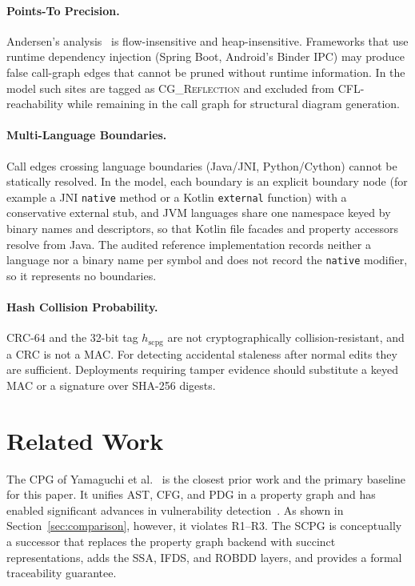 \documentclass[journal,10pt,twoside]{IEEEtran}
\newcommand{\hscpg}{h_{\mathrm{scpg}}}
\begin{document}
\paragraph{Points-To Precision.}
Andersen's analysis~\cite{anderson94} is flow-insensitive
and heap-insensitive.  Frameworks that use runtime
dependency injection (Spring Boot, Android's Binder IPC)
may produce false call-graph edges that cannot be pruned
without runtime information.  In the model such sites are
tagged as \textsc{CG\_Reflection} and excluded from
CFL-reachability while remaining in the call graph for
structural diagram generation.

\paragraph{Multi-Language Boundaries.}
Call edges crossing language boundaries (Java/JNI,
Python/Cython) cannot be statically resolved.  In the model,
each boundary is an explicit boundary node (for example a
JNI \texttt{native} method or a Kotlin \texttt{external}
function) with a conservative external stub, and JVM languages
share one namespace keyed by binary names and descriptors, so
that Kotlin file facades and property accessors resolve from
Java.  The audited reference implementation records neither a
language nor a binary name per symbol and does not record the
\texttt{native} modifier, so it represents no boundaries.

\paragraph{Hash Collision Probability.}
CRC-64 and the 32-bit tag $\hscpg$ are not cryptographically
collision-resistant, and a CRC is not a MAC.  For detecting
accidental staleness after normal edits they are sufficient.
Deployments requiring tamper evidence should substitute a
keyed MAC or a signature over SHA-256 digests.

\section{Related Work}\label{sec:related}

The CPG of Yamaguchi et al.~\cite{yamaguchi14} is the
closest prior work and the primary baseline for this paper.
It unifies AST, CFG, and PDG in a property graph and has
enabled significant advances in vulnerability
detection~\cite{yamaguchi14}.  As shown in
Section~\ref{sec:comparison}, however, it violates R1--R3.
The SCPG is conceptually a successor that replaces the
property graph backend with succinct representations, adds
the SSA, IFDS, and ROBDD layers, and provides a formal
traceability guarantee.
\end{document}
